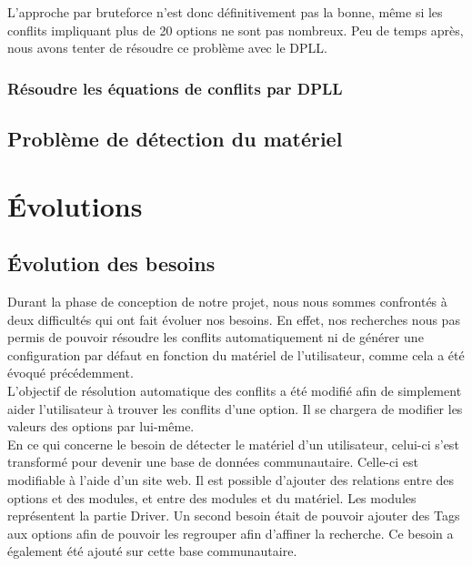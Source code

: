 \documentclass[16pts]{report}
\begin{document}
L'approche par bruteforce n'est donc définitivement pas la bonne, même si les
conflits impliquant plus de 20 options ne sont pas nombreux. Peu de temps après,
nous avons tenter de résoudre ce problème avec le DPLL.\\



            \subsubsection{Résoudre les équations de conflits par DPLL}
            \label{sub:Résoudre les équations de conflits par DPLL}

        \subsection{Problème de détection du matériel}
        \label{sub:Problème de détection du matériel}

    \section{Évolutions}
    \label{sec:Évolutions}
        \subsection{Évolution des besoins}
        \label{sec:Évolution des besoins}

Durant la phase de conception de notre projet, nous nous sommes confrontés à 
deux difficultés qui ont fait évoluer nos besoins. En effet, nos recherches 
nous pas permis de pouvoir résoudre les conflits automatiquement ni de générer 
une configuration par défaut en fonction du matériel de l'utilisateur, comme
cela a été évoqué précédemment. 
\\

L'objectif de résolution automatique des conflits a été modifié afin de 
simplement aider l'utilisateur à trouver les conflits d'une option. Il se 
chargera de modifier les valeurs des options par lui-même.
\\

En ce qui concerne le besoin de détecter le matériel d'un utilisateur, celui-ci 
s'est transformé pour devenir une base de données communautaire. Celle-ci est 
modifiable à l'aide d'un site web. Il est possible d'ajouter des relations 
entre des options et des modules, et entre des modules et du matériel. Les 
modules représentent la partie Driver. Un second besoin était de pouvoir 
ajouter des Tags aux options afin de pouvoir les regrouper afin d'affiner la 
recherche. Ce besoin a également été ajouté sur cette base communautaire.
\end{document}
